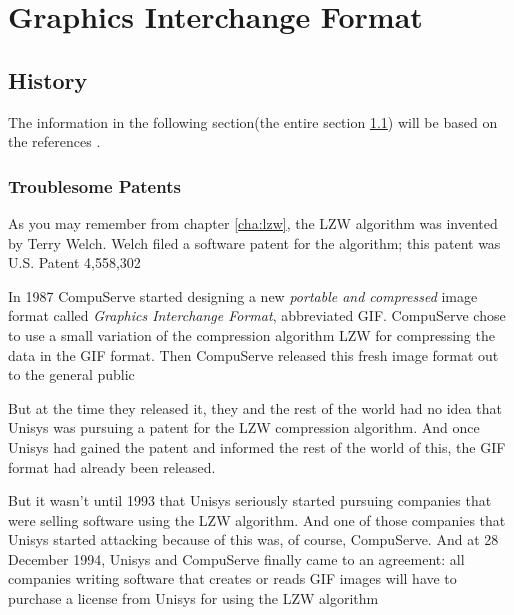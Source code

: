 \begin{comment}
  
\end{comment}

\chapter{Graphics Interchange Format}
\label{cha:gif}


  \section{History}
  \label{sec:gif-history}

  The information in the following section(the entire section
  \ref{sec:gif-history}) will be based on the references
  \cite{welch85:_u,roelofs09:_histor_portab_networ_graph_png_format,battilana:_gif_contr,caie:_sad,roelofs99:_png}.


  \subsection{Troublesome Patents}

  As you may remember from chapter \ref{cha:lzw}, the LZW algorithm
  was invented by Terry Welch. Welch filed a software patent for the
  algorithm; this patent was U.S. Patent 4,558,302

  \newcommand{\compus}{CompuServe\xspace}

  In 1987 \compus started designing a new \textit{portable and
    compressed} image format called \textit{Graphics Interchange
    Format}, abbreviated GIF. \compus chose to use a small variation
  of the compression algorithm LZW for compressing the data in the GIF
  format. Then \compus released this fresh image format out to the
  general public

  But at the time they released it, they and the rest of the world had
  no idea that Unisys was pursuing a patent for the LZW compression
  algorithm. And once Unisys had gained the patent and informed the
  rest of the world of this, the GIF format had already been released.

  But it wasn't until 1993 that Unisys seriously started pursuing
  companies that were selling software using the LZW algorithm. And
  one of those companies that Unisys started attacking because of this
  was, of course, \compus. And at 28 December 1994, Unisys and \compus
  finally came to an agreement: all companies writing software that
  creates or reads GIF images will have to purchase a license from
  Unisys for using the LZW algorithm

